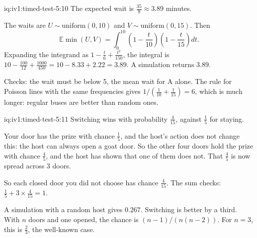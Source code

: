 \begin{solution}{iq:iv1:timed-test-5:10}
The expected wait is $\frac{35}{9} \approx 3.89$ minutes.

The waits are $U \sim \text{uniform}(0, 10)$ and $V \sim \text{uniform}(0, 15)$. Then
\[
\mathbb{E}\min(U, V) = \int_0^{10}\left(1 - \frac{t}{10}\right)\left(1 - \frac{t}{15}\right)dt.
\]
Expanding the integrand as $1 - \frac{t}{6} + \frac{t^2}{150}$, the integral is $10 - \frac{100}{12} + \frac{1000}{450} = 10 - 8.33 + 2.22 = 3.89$. A simulation returns $3.89$.

Checks: the wait must be below 5, the mean wait for A alone. The rule for Poisson lines with the same frequencies gives $1/(\frac{1}{10} + \frac{1}{15}) = 6$, which is much longer: regular buses are better than random ones.

\end{solution}

\begin{solution}{iq:iv1:timed-test-5:11}
Switching wins with probability $\frac{4}{15}$, against $\frac15$ for staying.

Your door has the prize with chance $\frac15$, and the host's action does not change this: the host can always open a goat door. So the other four doors hold the prize with chance $\frac45$, and the host has shown that one of them does not. That $\frac45$ is now spread across 3 doors.

So each closed door you did not choose has chance $\frac{4}{15}$. The sum checks: $\frac15 + 3 \times \frac{4}{15} = 1$.

A simulation with a random host gives $0.267$. Switching is better by a third. With $n$ doors and one opened, the chance is $(n - 1)/(n(n - 2))$. For $n = 3$, this is $\frac23$, the well-known case.

\end{solution}


